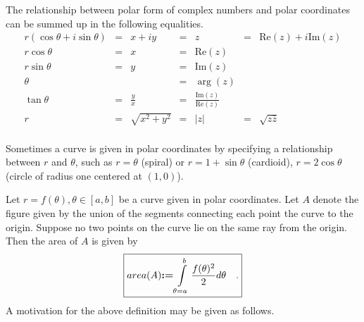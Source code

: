 \documentclass[12pt]{book}
\renewcommand{\optionalDisplay}[1]{}
\renewcommand{\Im}{\mathrm{Im}}
\renewcommand{\Re}{\mathrm{Re}}
\newcommand{\eqdef}{\textbf{:=}}
\begin{document}
The relationship between polar form of complex numbers and polar coordinates can be summed up in the following equalities.
\[
\begin{array}{rclclcl}
r(\cos \theta+i\sin\theta) &=&  x+iy&=& z&=&\Re (z)+i\Im(z)\\
r\cos\theta&=&x&=&\Re(z)\\
r\sin\theta&=&y&=&\Im(z)\\
\theta&&&=& \arg (z)\\
\tan \theta &=&\displaystyle\frac{y}{x}&=&\displaystyle\frac{\Im (z)}{\Re (z)}\\
r&=&\sqrt{x^2+y^2}&=& |z|&=&\sqrt{z\bar z}\\
\end{array}
\]

 Sometimes a curve is given in polar coordinates by specifying a relationship between $r$ and $\theta$, such as $r=\theta$ (spiral) or $r=1+\sin \theta$ (cardioid), $r=2\cos \theta$ (circle of radius one centered at $(1,0)$).

\optionalDisplay{
\psset{xunit=1cm,yunit=1cm}
\begin{pspicture*}(-5,-5)(5,5)
\rput (3,3){$r=\theta$}
\psaxes[labels=none, ticks=x]{<->}(0,0)(-4.5,-4.5)(4.5,4.5)
\parametricplot[linecolor=red, plotpoints=500]{0}{720}{t cos t mul 180 div t sin t mul 180 div }
\end{pspicture*}

\psset{xunit=1cm,yunit=1cm}
\begin{pspicture*}(-5,-5)(5,5)
\rput (3,3){$r=1+\sin\theta$}
\psaxes[labels=none, ticks=x]{<->}(0,0)(-4.5,-4.5)(4.5,4.5)
\parametricplot[linecolor=red, plotpoints=500]{0}{360}{1 t sin add t cos mul
 1 t sin add t sin mul}
\end{pspicture*}

\psset{xunit=1cm,yunit=1cm}
\begin{pspicture*}(-5,-5)(5,5)
\rput (3,3){$r=2\cos\theta$}
\psaxes[labels=none, ticks=x]{<->}(0,0)(-4.5,-4.5)(4.5,4.5)
\parametricplot[linecolor=red, plotpoints=500]{0}{360}
{ t cos 2 mul t cos mul
  t cos 2 mul t sin mul}
\end{pspicture*}
} %

 Let $r=f(\theta), \theta\in [a,b]$ be a curve given in polar coordinates.  Let $A$ denote the figure given by the union of the segments connecting each point the curve to the origin. Suppose no two points on the curve lie on the same ray from the origin. Then the area of $A$ is given by
\begin{equation}\boxed{\label{eqAreaUnderPolarCurve}
area(A)\eqdef \int\limits_{\theta=a}^b \frac{f(\theta)^2}{2}d\theta\quad .
}
\end{equation}
A motivation for the above definition may be given as follows.
\end{document}

